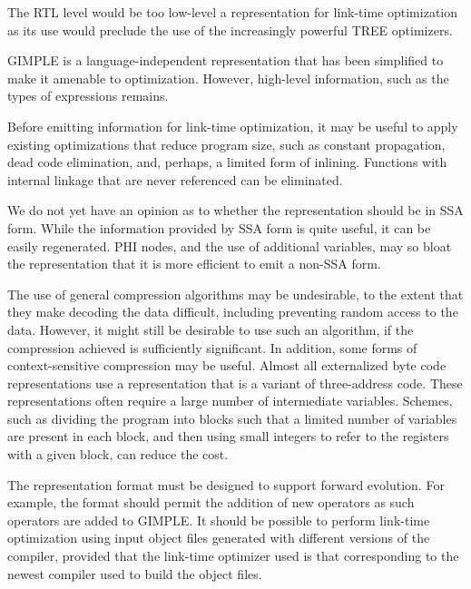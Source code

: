 \begin{rationale}
  The RTL level would be too low-level a representation for
  link-time optimization as its use would preclude the use of the
  increasingly powerful TREE optimizers.

  GIMPLE is a language-independent representation that has been
  simplified to make it amenable to optimization.  However, high-level
  information, such as the types of expressions remains.

  Before emitting information for link-time optimization, it may be
  useful to apply existing optimizations that reduce program size,
  such as constant propagation, dead code elimination, and, perhaps, a
  limited form of inlining.  Functions with internal linkage that are
  never referenced can be eliminated.

  We do not yet have an opinion as to whether the representation
  should be in SSA form.  While the information provided by SSA form
  is quite useful, it can be easily regenerated.  PHI nodes, and the
  use of additional variables, may so bloat the representation that it
  is more efficient to emit a non-SSA form.

  The use of general compression algorithms may be undesirable, to the
  extent that they make decoding the data difficult, including
  preventing random access to the data.  However, it might still be
  desirable to use such an algorithm, if the compression achieved is
  sufficiently significant.  In addition, some forms of
  context-sensitive compression may be useful.  Almost all
  externalized byte code representations use a representation that is
  a variant of three-address code.  These representations often
  require a large number of intermediate variables.  Schemes, such as
  dividing the program into blocks such that a limited number of
  variables are present in each block, and then using small integers
  to refer to the registers with a given block, can reduce the cost.
\end{rationale}

\begin{requirement}
  The representation format must be designed to support forward
  evolution.  For example, the format should permit the addition of
  new operators as such operators are added to GIMPLE.  It should be
  possible to perform link-time optimization using input object files
  generated with different versions of the compiler, provided that the
  link-time optimizer used is that corresponding to the newest
  compiler used to build the object files.
\end{requirement}

